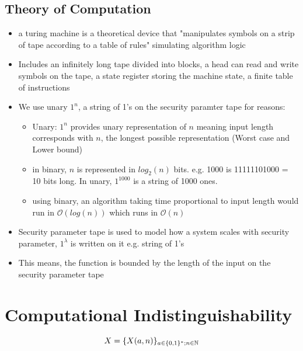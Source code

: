 \subsection*{Theory of Computation}
\begin{itemize}
    \item a turing machine is a theoretical device that "manipulates symbols on a strip of tape according to a table of rules" simulating algorithm logic
    \item Includes an infinitely long tape divided into blocks, a head can read and write symbols on the tape, a state register storing the machine state, a finite table of instructions
    \item We use unary $1^n$, a string of 1's on the security paramter tape for reasons:
    \begin{itemize}
        \item Unary: $1^n$ provides unary representation of $n$ meaning input length corresponds with $n$, the longest possible representation (Worst case and Lower bound)
        \item in binary, $n$ is represented in $log_2(n)$ bits. e.g. 1000 is 11111101000 = 10 bits long. In unary, $1^{1000}$ is a string of 1000 ones.
        \item using binary, an algorithm taking time proportional to input length would run in $\mathcal{O}(log(n))$ which runs in $\mathcal{O}(n)$
    \end{itemize}
    \item Security parameter tape is used to model how a system scales with security parameter, $1^{\lambda}$ is written on it e.g. string of 1's
    \item This means, the function is bounded by the length of the input on the security parameter tape
\end{itemize}

\section*{Computational Indistinguishability}
$$
X = \{X(a,n)\}_{a\in\{0,1\}^*; n \in \mathbb{N}}
$$

